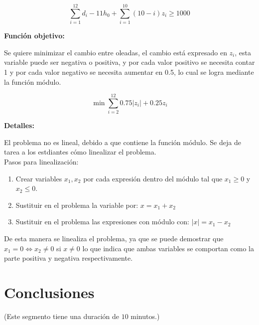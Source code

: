 \documentclass[a4paper,10pt,twocolumn]{article}
\theoremstyle{theorem}
\theoremstyle{definition}
\theoremstyle{remark}
\begin{document}
$$
\sum_{i=1}^{12} d_i - 11 h_0 + \sum_{i=1}^{10}(10-i)z_i \ge 1000
$$

\textbf{Función objetivo:}

Se quiere minimizar el cambio entre oleadas, el cambio está expresado en $z_i$, esta variable puede ser negativa o positiva, y por cada valor
positivo se necesita contar 1 y por cada valor negativo se necesita aumentar en 0.5, lo cual se logra mediante la función módulo.

$$
\min \sum_{i=2}^{12} 0.75 |z_i| + 0.25 z_i
$$

\textbf{Detalles:}

El problema no es lineal, debido a que contiene la función módulo. Se deja de tarea a los estdiantes cómo linealizar el problema.\\

Pasos para linealización:

\renewcommand{\theenumi}{\arabic{enumi}} %
\begin{enumerate}
	\item Crear variables $x_1, x_2$ por cada expresión dentro del módulo tal que $x_1 \ge 0$ y $x_2 \le 0$.
	\item Sustituir en el problema la variable por: $x = x_1 + x_2$
	\item Sustituir en el problema las expresiones con módulo con: $|x| = x_1 - x_2$
\end{enumerate}

De esta manera se linealiza el problema, ya que se puede demostrar que $x_1 = 0 \iff x_2 \neq 0$ si $x \neq 0$ lo que indica que ambas variables se comportan como la parte positiva y negativa respectivamente.


\section{Conclusiones} \label{sec:conc}

(Este segmento tiene una duración de $10$ minutos.)\\
 
%
\end{document}
